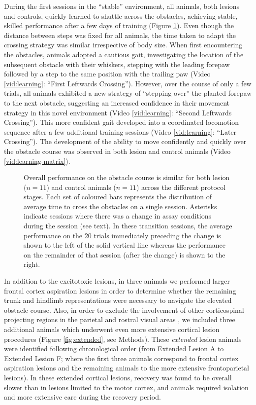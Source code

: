 During the first sessions in the ``stable'' environment, all animals, both lesions and controls, quickly learned to shuttle across the obstacles, achieving stable, skilled performance after a few days of training (Figure \ref{fig:learning}). Even though the distance between steps was fixed for all animals, the time taken to adapt the crossing strategy was similar irrespective of body size. When first encountering the obstacles, animals adopted a cautious gait, investigating the location of the subsequent obstacle with their whiskers, stepping with the leading forepaw followed by a step to the same position with the trailing paw (Video \ref{vid:learning}: ``First Leftwards Crossing''). However, over the course of only a few trials, all animals exhibited a new strategy of ``stepping over'' the planted forepaw to the next obstacle, suggesting an increased confidence in their movement strategy in this novel environment (Video \ref{vid:learning}: ``Second Leftwards Crossing''). This more confident gait developed into a coordinated locomotion sequence after a few additional training sessions (Video \ref{vid:learning}: ``Later Crossing''). The development of the ability to move confidently and quickly over the obstacle course was observed in both lesion and control animals (Video \ref{vid:learning-matrix}).

\begin{figure}
\centering

\caption{Overall performance on the obstacle course is similar for both lesion ($n = 11$) and control animals ($n = 11$) across the different protocol stages. Each set of coloured bars represents the distribution of average time to cross the obstacles on a single session. Asterisks indicate sessions where there was a change in assay conditions during the session (see text). In these transition sessions, the average performance on the 20 trials immediately preceding the change is shown to the left of the solid vertical line whereas the performance on the remainder of that session (after the change) is shown to the right.}
\label{fig:learning}
\end{figure}

In addition to the excitotoxic lesions, in three animals we performed larger frontal cortex aspiration lesions in order to determine whether the remaining trunk and hindlimb representations were necessary to navigate the elevated obstacle course. Also, in order to exclude the involvement of other corticospinal projecting regions in the parietal and rostral visual areas \cite{Miller1987}, we included three additional animals which underwent even more extensive cortical lesion procedures (Figure \ref{fig:extended}, see Methods). These \emph{extended} lesion animals were identified following chronological order (from Extended Lesion A to Extended Lesion F; where the first three animals correspond to frontal cortex aspiration lesions and the remaining animals to the more extensive frontoparietal lesions). In these extended cortical lesions, recovery was found to be overall slower than in lesions limited to the motor cortex, and animals required isolation and more extensive care during the recovery period.

